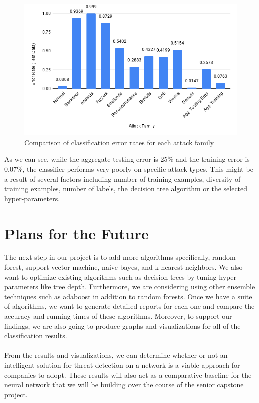\documentclass[
11pt, %
letterpaper, %
oneside, %
headinclude,footinclude, %
BCOR5mm, %
]{scrartcl}
\begin{document}
\begin{figure}[H]
    \centering
    \includegraphics[scale=0.5]{decision_tree_chart.png}
    \caption{Comparison of classification error rates for each attack family}
    \label{fig:my_label}
\end{figure}

As we can see, while the aggregate testing error is 25\% and the training error is 0.07\%, the classifier performs very poorly on specific attack types. This might be a result of several factors including number of training examples, diversity of training examples, number of labels, the decision tree algorithm or the selected hyper-parameters.

\section{Plans for the Future}
The next step in our project is to add more algorithms specifically, random forest, support vector machine, naive bayes, and k-nearest neighbors. We also want to optimize existing algorithms such as decision trees by tuning hyper parameters like tree depth. Furthermore, we are considering using other ensemble techniques such as adaboost in addition to random forests. Once we have a suite of algorithms, we want to generate detailed reports for each one and compare the accuracy and running times of these algorithms. Moreover, to support our findings, we are also going to produce graphs and visualizations for all of the classification results.\\\\
From the results and visualizations, we can determine whether or not an intelligent solution for threat detection on a network is a viable approach for companies to adopt. These results will also act as a comparative baseline for the neural network that we will be building over the course of the senior capstone project.
\end{document}
